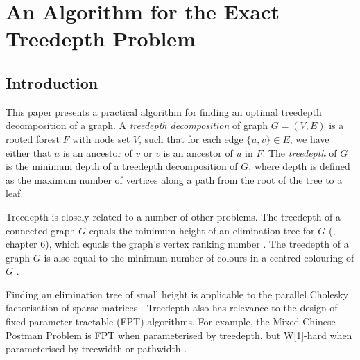 \chapter{An Algorithm for the Exact Treedepth Problem}

{
    \renewcommand{\arraystretch}{.83}



    \newcommand\Edge{\text{--}}

    \newcommand\TDGeneral{\FuncSty{elimination\_forest}}
    \newcommand\TDConnected{\FuncSty{elimination\_tree}}
    \newcommand\TDOptimise{\FuncSty{optimise}}

    \section{Introduction}

    This paper presents a practical algorithm for finding an optimal treedepth decomposition of a graph.
    A \emph{treedepth decomposition} of graph $G=(V,E)$ is a rooted forest $F$ with node set $V$, such that for
    each edge $\{u,v\} \in E$, we have either that $u$ is an ancestor of $v$ or $v$ is an ancestor of $u$
    in $F$.  The \emph{treedepth} of $G$ is the minimum depth of a treedepth decomposition of $G$, where
    depth is defined as the maximum number of vertices along a path from the root of the tree to a leaf.

    Treedepth is closely related to a number of other problems.  The treedepth of a
    connected graph $G$ equals the minimum height of an elimination tree for $G$
    (\cite{DBLP:books/daglib/0030491}, chapter 6), which equals
    the graph's vertex ranking number \cite{DBLP:conf/stacs/DeogunKKM94}.
    The treedepth of a graph $G$ is also equal to the minimum number of
    colours in a centred colouring of $G$ \cite{DBLP:books/daglib/0030491}.

    Finding an elimination tree of small height is applicable to the parallel Cholesky factorisation
    of sparse matrices \cite{zmijewski1986parallel}.
    Treedepth also has relevance to the design of fixed-parameter tractable (FPT) algorithms.  For example,
    the Mixed Chinese Postman Problem is FPT when parameterised by treedepth, but W[1]-hard
    when parameterised by treewidth or pathwidth \cite{DBLP:journals/siamdm/GutinJW16}.

}
